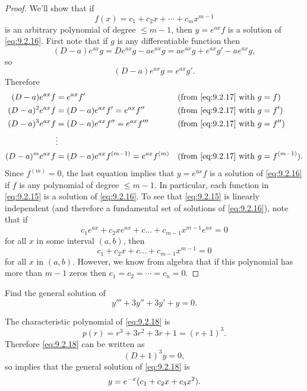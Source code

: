 \begin{proof}
We'll show that if
\[
f(x)=c_1+c_2x+\cdots+c_mx^{m-1}
\]
is an arbitrary polynomial of degree $\le m-1$, then $y=e^{ax}f$
is a solution of \eqref{eq:9.2.16}. First note that if $g$ is any
differentiable function then
\[
(D-a)e^{ax}g=De^{ax}g-ae^{ax}g=ae^{ax}g+e^{ax}g'-ae^{ax}g,
\]
so
\begin{equation} \label{eq:9.2.17}
(D-a)e^{ax}g=e^{ax}g'.
\end{equation}
Therefore
\begin{align*}
(D-a)e^{ax}f
&=e^{ax}f'&&\text{(from \eqref{eq:9.2.17} with $g=f$)}\\
(D-a)^2e^{ax}f
&=(D-a)e^{ax}f'=e^{ax}f''&&\text{(from \eqref{eq:9.2.17} with $g=f'$)}\\
(D-a)^3e^{ax}f
&=(D-a)e^{ax}f''=e^{ax}f'''&&\text{(from \eqref{eq:9.2.17} with $g=f''$)}\\
&\vdots\\
(D-a)^me^{ax}f
&=(D-a)e^{ax}f^{(m-1)}=e^{ax}f^{(m)}
&&\text{(from \eqref{eq:9.2.17} with $g=f^{(m-1)}$)}.
\end{align*}
Since $f^{(m)}=0$, the last equation implies that $y=e^{ax}f$ is a
solution of \eqref{eq:9.2.16} if $f$ is any polynomial of degree $\le
m-1$. In particular, each function in \eqref{eq:9.2.15} is a solution of
\eqref{eq:9.2.16}. To see that \eqref{eq:9.2.15} is linearly independent (and
therefore a fundamental set of solutions of \eqref{eq:9.2.16}), note that
if
\[
c_1e^{ax}+c_2xe^{ax}+c\dots+c_{m-1}x^{m-1}e^{ax}=0
\]
for all $x$ in some interval $(a,b)$, then
\[
c_1+c_2x+c\dots+c_{m-1}x^{m-1}=0
\]
for all $x$ in $(a,b)$.  However, we know from algebra that if this
polynomial has more than $m-1$ zeros then $c_1=c_2=\cdots=c_n=0$.
\end{proof}

\begin{example}\label{example:9.2.5}
Find the general solution of
\begin{equation} \label{eq:9.2.18}
y'''+3y''+3y'+y=0.
\end{equation}
\end{example}

\begin{solution}
The characteristic polynomial of \eqref{eq:9.2.18} is
\[
p(r)=r^3+3r^2+3r+1=(r+1)^3.
\]
Therefore \eqref{eq:9.2.18} can be written as
\[
(D+1)^3y=0,
\]
so  implies that the general solution of
\eqref{eq:9.2.18} is
\[
y=e^{-x}(c_1+c_2x+c_3x^2).\qedhere
\]
\end{solution}

